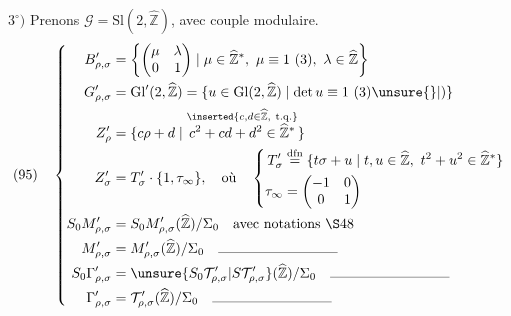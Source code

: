 
$3^\circ)$ Prenons $\mathcal G=\mathrm{Sl}(2,\widehat{\mathbb Z})$, avec couple modulaire.
\[
(95)\quad\left\{\begin{aligned}
B'_{\rho,\sigma}&=
\left\{\begin{pmatrix}\mu&\lambda\\0&1\end{pmatrix}\mid
\mu\in\widehat{\mathbb Z}^{*},\ \mu\equiv1\ (3),\ \lambda\in\widehat{\mathbb Z}\right\}\\
G'_{\rho,\sigma}&=\mathrm{Gl}'(2,\widehat{\mathbb Z})
=\{u\in\mathrm{Gl}(2,\widehat{\mathbb Z})\mid\det u\equiv1\ (3)\unsure{\}|)}\\
Z'_\rho&=\{c\rho+d\mid
\overset{\inserted{c,d\in\widehat{\mathbb Z},\ \text{t.q.}}}{c^2+cd+d^2\in\widehat{\mathbb Z}^{*}}\}\\
Z'_\sigma&=T'_\sigma\cdot\{1,\tau_\infty\},\quad\text{où}\quad
\left\{\begin{aligned}
T'_\sigma&\overset{\mathrm{dfn}}=
\{t\sigma+u\mid t,u\in\widehat{\mathbb Z},\ t^2+u^2\in\widehat{\mathbb Z}^{*}\}\\
\tau_\infty&=\begin{pmatrix}-1&0\\0&1\end{pmatrix}
\end{aligned}\right.\\
S_0M'_{\rho,\sigma}&=S_0M'_{\rho,\sigma}(\widehat{\mathbb Z})/\Sigma_0\quad\text{avec notations \S48}\\
M'_{\rho,\sigma}&=M'_{\rho,\sigma}(\widehat{\mathbb Z})/\Sigma_0\quad\rule{3cm}{0.3pt}\\
S_0\Gamma'_{\rho,\sigma}&=\unsure{S_0\mathcal T'_{\rho,\sigma}|S\mathcal T'_{\rho,\sigma}}(\widehat{\mathbb Z})/\Sigma_0\quad\rule{3cm}{0.3pt}\\
\Gamma'_{\rho,\sigma}&=\mathcal T'_{\rho,\sigma}(\widehat{\mathbb Z})/\Sigma_0\quad\rule{3cm}{0.3pt}
\end{aligned}\right.
\]

